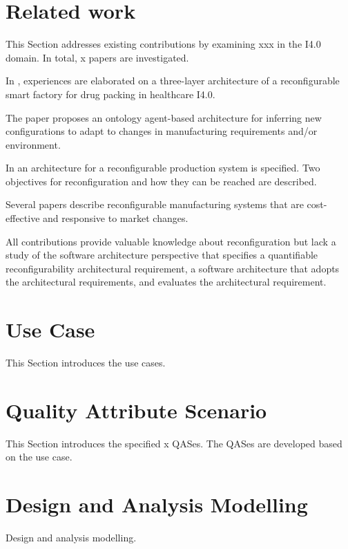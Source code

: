 \documentclass[conference]{IEEEtran}
\begin{document}
\section{Related work}
\label{sec:related_work}
This Section addresses existing contributions by examining xxx in the I4.0 domain. 
In total, x papers are investigated. 

In \cite{Wan2019Reconfigurable}, experiences are elaborated on a three-layer architecture of a reconfigurable smart factory for drug packing in healthcare I4.0. 

The paper \cite{Yazen2010Ontology} proposes an ontology agent-based architecture for inferring  new configurations to adapt to changes in manufacturing requirements and/or environment.

In \cite{Leitao2016Specification,Angione2017Integration} an architecture for a reconfigurable production system is specified.
Two objectives for reconfiguration and how they can be reached are described.

Several papers \cite{Koren1999Reconfigurable,Koren2010Design,Bortolini2018Reconfigurable} describe reconfigurable manufacturing systems that are cost-effective and responsive to market changes.

All contributions provide valuable knowledge about reconfiguration but lack a study of the software architecture perspective that specifies a quantifiable reconfigurability architectural requirement, a software architecture that adopts the architectural requirements, and evaluates the architectural requirement. 


\section{Use Case}
\label{sec:use_case}
This Section introduces the use cases.

\section{Quality Attribute Scenario}
\label{sec:qas}
This Section introduces the specified x QASes.
The QASes are developed based on the use case.


\section{Design and Analysis Modelling}
\label{sec:design_and_analysis_modelling}
Design and analysis modelling.
\end{document}
